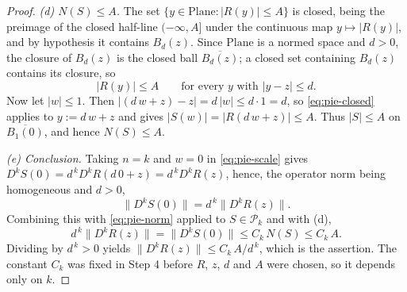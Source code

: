 \begin{proof}
\emph{(d) $N(S)\le A$.}  The set $\{y\in\mathrm{Plane}:\lvert R(y)\rvert\le A\}$ is closed,
being the preimage of the closed half-line $(-\infty,A]$ under the continuous map
$y\mapsto\lvert R(y)\rvert$, and by hypothesis it contains $B_d(z)$.  Since $\mathrm{Plane}$ is a
normed space and $d>0$, the closure of $B_d(z)$ is the closed ball $\overline{B_d(z)}$; a closed
set containing $B_d(z)$ contains its closure, so
\begin{equation}\label{eq:pie-closed}
  \lvert R(y)\rvert\le A\qquad\text{for every }y\text{ with }\lvert y-z\rvert\le d .
\end{equation}
Now let $\lvert w\rvert\le1$.  Then $\lvert(d\,w+z)-z\rvert=d\,\lvert w\rvert\le d\cdot1=d$, so
\eqref{eq:pie-closed} applies to $y:=d\,w+z$ and gives
$\lvert S(w)\rvert=\lvert R(d\,w+z)\rvert\le A$.  Thus $\lvert S\rvert\le A$ on
$\overline{B_1(0)}$, and hence $N(S)\le A$.

\emph{(e) Conclusion.}  Taking $n=k$ and $w=0$ in \eqref{eq:pie-scale} gives
$D^{k}S(0)=d^{\,k}D^{k}R(d\,0+z)=d^{\,k}D^{k}R(z)$, hence, the operator norm being homogeneous and $d>0$,
\[
  \bigl\lVert D^{k}S(0)\bigr\rVert=d^{\,k}\bigl\lVert D^{k}R(z)\bigr\rVert .
\]
Combining this with \eqref{eq:pie-norm} applied to $S\in\mathcal{P}_k$ and with (d),
\[
  d^{\,k}\bigl\lVert D^{k}R(z)\bigr\rVert
  =\bigl\lVert D^{k}S(0)\bigr\rVert\le C_k\,N(S)\le C_k\,A .
\]
Dividing by $d^{\,k}>0$ yields
$\bigl\lVert D^{k}R(z)\bigr\rVert\le C_k\,A/d^{\,k}$, which is the assertion.  The constant
$C_k$ was fixed in Step 4 before $R$, $z$, $d$ and $A$ were chosen, so it depends only on $k$.
\end{proof}
